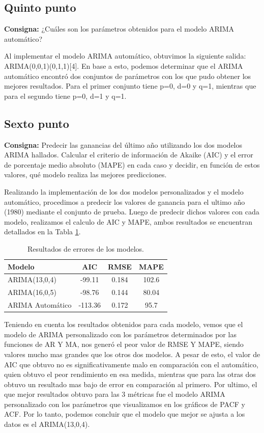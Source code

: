 \documentclass{article} %
\begin{document}
\subsection{Quinto punto}

\textbf{Consigna:} ¿Cuáles son los parámetros obtenidos para el modelo ARIMA automático?

Al implementar el modelo ARIMA automático, obtuvimos la siguiente salida: ARIMA(0,0,1)(0,1,1)[4]. En base a esto, podemos determinar que el ARIMA automático encontró dos conjuntos de parámetros con los que pudo obtener los mejores resultados. Para el primer conjunto tiene p=0, d=0 y q=1, mientras que para el segundo tiene p=0, d=1 y q=1.


\subsection{Sexto punto}

\textbf{Consigna:} Predecir las ganancias del último año utilizando los dos modelos ARIMA hallados. Calcular el criterio de información de Akaike (AIC) y el error de porcentaje medio absoluto (MAPE) en cada caso y decidir, en función de estos valores, qué modelo realiza las mejores predicciones.

Realizando la implementación de los dos modelos personalizados y el modelo automático, procedimos a predecir los valores de ganancia para el ultimo año (1980) mediante el conjunto de prueba. Luego de predecir dichos valores con cada modelo, realizamos el calculo de AIC y MAPE, ambos resultados se encuentran detallados en la Tabla \ref{tab:table-punto-4-1}.

\begin{table}[H]
	\centering
		\begin{tabular}{||l || c || c || c ||}
			\hline
			\hline
			Modelo & AIC & RMSE & MAPE\\
			\hline			
			\hline
			ARIMA(13,0,4) & -99.11 & 0.184 & 102.6 \\
			\hline
			ARIMA(16,0,5)  & -98.76 & 0.144 & 80.04 \\
			\hline
			ARIMA Automático & -113.36 & 0.172 & 95.7 \\
			\hline
			\hline
		\end{tabular}
		\caption{Resultados de errores de los modelos.}
	\label{tab:table-punto-4-1}
\end{table}

Teniendo en cuenta los resultados obtenidos para cada modelo, vemos que el modelo de ARIMA personalizado con los parámetros determinados por las funciones de AR Y MA, nos generó el peor valor de RMSE Y MAPE, siendo valores mucho mas grandes que los otros dos modelos. A pesar de esto, el valor de AIC que obtuvo no es significativamente malo en comparación con el automático, quien obtuvo el peor rendimiento en esa medida, mientras que para las otras dos obtuvo un resultado mas bajo de error en comparación al primero. Por ultimo, el que mejor resultados obtuvo para las 3 métricas fue el modelo ARIMA personalizado con los parámetros que visualizamos en los gráficos de PACF y ACF. Por lo tanto, podemos concluir que el modelo que mejor se ajusta a los datos es el ARIMA(13,0,4).
\end{document}
